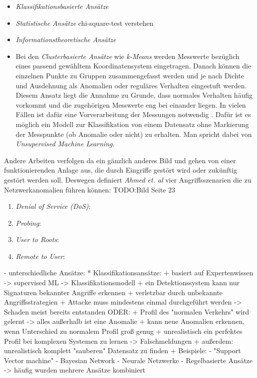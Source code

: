 \begin{itemize}
\item \textit{Klassifikationsbasierte Ansätze} 
\item \textit{Statistische Ansätze} chi-square-test verstehen \cite{ye2001anomaly}
\item \textit{Informationstheoretische Ansätze}
\item Bei den \textit{Clusterbasierte Ansätze} wie \textit{k-Means}\cite{likas2003global} werden Messwerte bezüglich eines passend gewähltem Koordinatensystem eingetragen. Danach können die einzelnen Punkte zu Gruppen zusammengefasst werden und je nach Dichte und Ausdehnung als Anomalien oder reguläres Verhalten eingestuft werden. Diesem Ansatz liegt die Annahme zu Grunde, dass normales Verhalten häufig vorkommt und die zugehörigen Messwerte eng bei einander liegen. In vielen Fällen ist dafür eine Vorverarbeitung der Messungen notwendig \cite{munz2007traffic}. Dafür ist es möglich ein Modell zur Klassifikation von einem Datensatz ohne Markierung der Messpunkte (ob Anomalie oder nicht) zu erhalten. Man spricht dabei von \textit{Unsupervised Machine Learning}\cite{munz2007traffic}.
\end{itemize}


Andere Arbeiten verfolgen da ein gänzlich anderes Bild und gehen von einer funktionierenden Anlage aus, die durch Eingriffe gestört wird oder zukünftig gestört werden soll. Deswegen definiert \textit{Ahmed et. al} \cite{ahmed2016survey} vier Angriffsszenarien die zu Netzwerkanomalien führen können:
TODO:Bild Seite 23
\begin{enumerate}
\item \textit{Denial of Service (DoS)}:
\item \textit{Probing}:
\item \textit{User to Roots}:
\item \textit{Remote to User}:
\end{enumerate}

- unterschiedliche Ansätze:
	* Klassifikationsansätze:
		+ basiert auf Expertenwissen -> supervised ML -> Klassifikationsmodell
		+ ein Detektionssystem kann nur Signaturen bekannter Angriffe erkennen
		+ verletzbar durch unbekannte Angriffsstrategien
		+ Attacke muss mindestens einmal durchgeführt werden -> Schaden meist bereits entstanden
		ODER:
		+ Profil des "normalen Verkehrs" wird gelernt -> alles außerhalb ist eine Anomalie
		+ kann neue Anomalien erkennen, wenn Unterschied zu normalem Profil groß genug
		+ unrealistisch ein perfektes Profil bei komplexen Systemen zu lernen -> Falschmeldungen
		+ außerdem: unrealistisch komplett "sauberen" Datensatz zu finden
		+ Beispiele:
			- "Support Vector machine" \cite{noble2006support}
			- Bayesian Network \cite{kruegel2003bayesian}
			- Neurale Netzwerke \cite{zhang2001hide}
			- Regelbasierte Ansätze \cite{yang2013rule}
			-> häufig wurden mehrere Ansätze kombiniert

